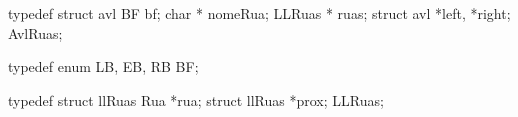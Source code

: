 typedef struct avl {
	BF bf;
	char * nomeRua;
	LLRuas * ruas;
	struct avl *left, *right;
}AvlRuas;

typedef enum {LB, EB, RB} BF;

typedef struct llRuas {
	Rua *rua;
	struct llRuas *prox;
}LLRuas;
